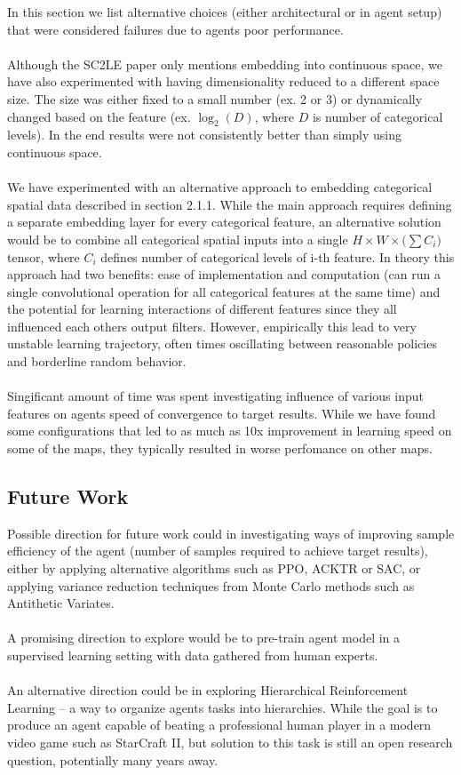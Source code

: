 In this section we list alternative choices (either architectural or in agent setup) that were considered failures due to agents poor performance.
\\\\
Although the SC2LE paper only mentions embedding into continuous space, we have also experimented with having dimensionality reduced to a different space size. The size was either fixed to a small number (ex. 2 or 3) or dynamically changed based on the feature (ex. $\log_2(D)$, where $D$ is number of categorical levels). In the end results were not consistently better than simply using continuous space.
\\\\
We have experimented with an alternative approach to embedding categorical spatial data described in section 2.1.1. While the main approach requires defining a separate embedding layer for every categorical feature, an alternative solution would be to combine all categorical spatial inputs into a single $H \times W \times \big (\sum C_i \big)$ tensor, where $C_i$ defines number of categorical levels of i-th feature. In theory this approach had two benefits: ease of implementation and computation (can run a single convolutional operation for all categorical features at the same time) and the potential for learning interactions of different features since they all influenced each others output filters. However, empirically this lead to very unstable learning trajectory, often times oscillating between reasonable policies and borderline random behavior.
\\\\
Singificant amount of time was spent investigating influence of various input features on agents speed of convergence to target results. While we have found some configurations that led to as much as 10x improvement in learning speed on some of the maps, they typically resulted in worse perfomance on other maps.

\subsection{Future Work}
Possible direction for future work could in investigating ways of improving sample efficiency of the agent (number of samples required to achieve target results), either by applying alternative algorithms such as PPO, ACKTR or SAC, or applying variance reduction techniques from Monte Carlo methods such as Antithetic Variates. 
\\\\
A promising direction to explore would be to pre-train agent model in a supervised learning setting with data gathered from human experts.
\\\\
An alternative direction could be in exploring Hierarchical Reinforcement Learning -- a way to organize agents tasks into hierarchies. While the goal is to produce an agent capable of beating a professional human player in a modern video game such as StarCraft II, but solution to this task is still an open research question, potentially many years away.